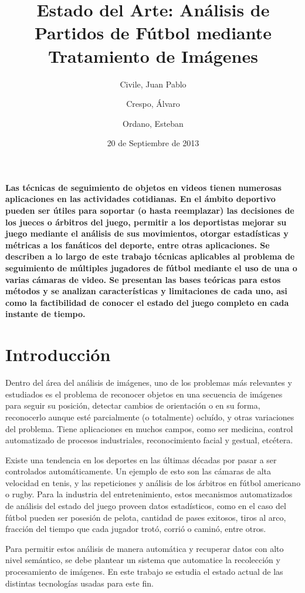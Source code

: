 \documentclass[a4paper,10pt]{article}
\title{Estado del Arte: Análisis de Partidos de Fútbol mediante Tratamiento de Imágenes}
\date{20 de Septiembre de 2013}
\author{Civile, Juan Pablo \and Crespo, Álvaro \and Ordano, Esteban }
\begin{document}
\pagestyle{fancy}
\maketitle
\thispagestyle{fancy}

\begin{customabstract}
\textbf{
Las técnicas de seguimiento de objetos en videos tienen numerosas aplicaciones
en las actividades cotidianas. En el ámbito deportivo pueden ser útiles para
soportar (o hasta reemplazar) las decisiones de los jueces o árbitros del
juego, permitir a los deportistas mejorar su juego mediante el análisis de sus
movimientos, otorgar estadísticas y métricas a los fanáticos del deporte, entre
otras aplicaciones. Se describen a lo largo de este trabajo técnicas aplicables
al problema de seguimiento de múltiples jugadores de fútbol mediante el uso de
una o varias cámaras de video. Se presentan las bases teóricas para estos
métodos y se analizan características y limitaciones de cada uno, asi como la
factibilidad de conocer el estado del juego completo en cada instante de tiempo.
} \end{customabstract}

\part*{Introducción}

Dentro del área del análisis de imágenes, uno de los problemas más relevantes y
estudiados es el problema de reconocer objetos en una secuencia de
imágenes para seguir su posición, detectar cambios de orientación o en su
forma, reconocerlo aunque esté parcialmente (o totalmente) ocluído, y otras
variaciones del problema. Tiene aplicaciones en muchos campos, como ser
medicina, control automatizado de procesos industriales, reconocimiento facial
y gestual, etcétera.

Existe una tendencia en los deportes en las últimas décadas por pasar a ser
controlados automáticamente. Un ejemplo de esto son las cámaras de alta
velocidad en tenis, y las repeticiones y análisis de los árbitros en fútbol
americano o rugby. Para la industria del entretenimiento, estos
mecanismos automatizados de análisis del estado del juego proveen datos
estadísticos, como en el caso del fútbol pueden ser posesión de pelota, cantidad
de pases exitosos, tiros al arco, fracción del tiempo que cada jugador trotó,
corrió o caminó, entre otros.

Para permitir estos análisis de manera automática y recuperar datos con alto
nivel semántico, se debe plantear un sistema que automatice la recolección
y procesamiento de imágenes. En este trabajo se estudia el estado
actual de las distintas tecnologías usadas para este fin.
\end{document}

